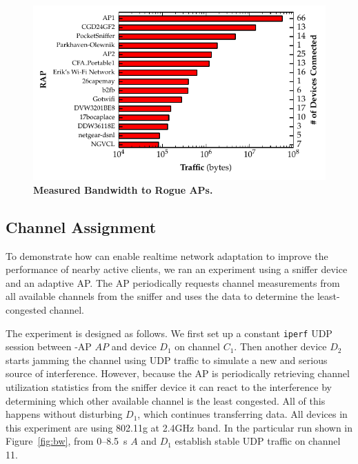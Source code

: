 \newpage

\begin{figure}[t]
  \centering
  \includegraphics[width=\columnwidth]{./figures/RAPTrafficGraph.pdf}
  \vspace*{-4mm}
  \caption{\textbf{Measured Bandwidth to Rogue APs.}}
  \label{fig:rap}
  \vspace{-3mm}
\end{figure}


\subsection{Channel Assignment}
\label{subsec-channel}

To demonstrate how \PS{} can enable realtime network adaptation to improve
the performance of nearby active clients, we ran an experiment using a
sniffer device and an adaptive AP. The AP periodically requests channel
measurements from all available channels from the sniffer and uses the data
to determine the least-congested channel.

The experiment is designed as follows. We first set up a constant
\texttt{iperf} UDP session between \PS{}-AP $AP$ and device $D_1$ on channel
$C_1$. Then another device $D_2$ starts jamming the channel using UDP traffic
to simulate a new and serious source of interference. However, because the AP
is periodically retrieving channel utilization statistics from the sniffer
device it can react to the interference by determining which other available
channel is the least congested. All of this happens without disturbing $D_1$, 
which continues transferring data. All devices in this experiment are using
802.11g at 2.4GHz band. In the particular run shown in Figure~\ref{fig:bw},
from 0--8.5~s $A$ and $D_1$ establish stable UDP traffic on channel 11.

